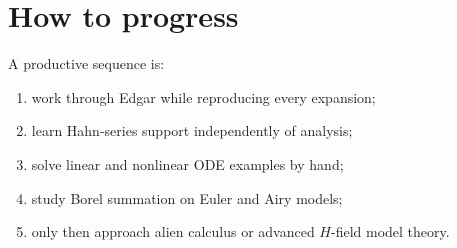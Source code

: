 \documentclass[11pt,oneside,openany]{book}
\theoremstyle{plain}
\theoremstyle{definition}
\theoremstyle{remark}
\begin{document}
\section{How to progress}
A productive sequence is:
\begin{enumerate}
  \item work through Edgar while reproducing every expansion;
  \item learn Hahn-series support independently of analysis;
  \item solve linear and nonlinear ODE examples by hand;
  \item study Borel summation on Euler and Airy models;
  \item only then approach alien calculus or advanced $H$-field model theory.
\end{enumerate}

\backmatter
\end{document}
